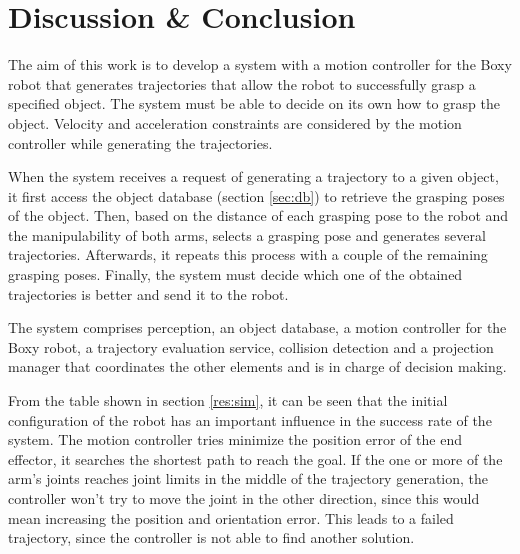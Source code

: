 

\chapter{Discussion \& Conclusion}

The aim of this work is to develop a system with a motion controller for the Boxy robot that generates trajectories that allow the robot to successfully grasp a specified object. The system must be able to decide on its own how to grasp the object. Velocity and acceleration constraints are considered by the motion controller while generating the trajectories. 

When the system receives a request of generating a trajectory to a given object, it first access the object database (section \ref{sec:db}) to retrieve the grasping poses of the object. Then, based on the distance of each grasping pose to the robot and the manipulability of both arms, selects a grasping pose and generates several trajectories. Afterwards, it repeats this process with a couple of the remaining grasping poses. Finally, the system must decide which one of the obtained trajectories is better and send it to the robot.

The system comprises perception, an object database, a motion controller for the Boxy robot, a trajectory evaluation service, collision detection and a projection manager that coordinates the other elements and is in charge of decision making.

From the table shown in section \ref{res:sim}, it can be seen that the initial configuration of the robot has an important influence in the success rate of the system. The motion controller tries minimize the position error of the end effector, it searches the shortest path to reach the goal. If the one or more of the arm's joints reaches joint limits in the middle of the trajectory generation, the controller won't try to move the joint in the other direction, since this would mean increasing the position and orientation error. This leads to a failed trajectory, since the controller is not able to find another solution.

